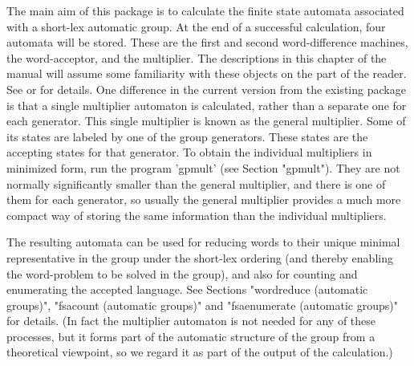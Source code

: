 
The main aim of this package is to calculate the finite state automata
associated with a short-lex automatic group. At the end of a
successful calculation, four automata will be stored. These are the first
and second word-difference machines, the word-acceptor, and the multiplier.
The descriptions in this  chapter of the manual will assume some familiarity
with these objects on the part of the reader.
See \cite{EHR91} or \cite{Holt94} for details. One difference in the
current version from the existing {\Automata} package
is that a single multiplier automaton is calculated,
rather than a separate one for each generator.
This single multiplier is known as the general multiplier. Some of its states
are labeled by one of the group generators. These states are the accepting
states for that generator. To obtain the individual multipliers in minimized
form, run the program 'gpmult' (see Section "gpmult"). They are not normally
significantly smaller than the general multiplier, and there is one of them
for each generator, so usually the general multiplier provides a much more
compact way of storing the same information than the individual multipliers.

The resulting automata
can be used for reducing words to their unique minimal representative in
the group under the short-lex ordering (and thereby enabling the
word-problem to be solved in the group), and also for counting and
enumerating the accepted language.
See Sections "wordreduce (automatic groups)", "fsacount (automatic groups)"
and "fsaenumerate (automatic groups)" for details.
(In fact the multiplier automaton is not needed for any of these processes,
but it forms part of the automatic structure of the group from a
theoretical viewpoint, so we regard it as part of the output of the
calculation.)

